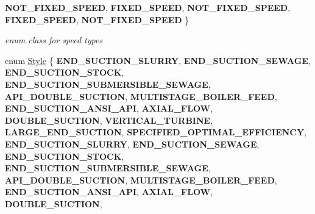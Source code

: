 \begin{DoxyCompactItemize}
{\bfseries N\+O\+T\+\_\+\+F\+I\+X\+E\+D\+\_\+\+S\+P\+E\+ED}, 
{\bfseries F\+I\+X\+E\+D\+\_\+\+S\+P\+E\+ED}, 
{\bfseries N\+O\+T\+\_\+\+F\+I\+X\+E\+D\+\_\+\+S\+P\+E\+ED}, 
\newline
{\bfseries F\+I\+X\+E\+D\+\_\+\+S\+P\+E\+ED}, 
{\bfseries N\+O\+T\+\_\+\+F\+I\+X\+E\+D\+\_\+\+S\+P\+E\+ED}
 \}\begin{DoxyCompactList}\small\item\em enum class for speed types \end{DoxyCompactList}
\item 
\mbox{\label{class_pump_aef354601ce4218258cc898b35a1e90ff}} 
enum \hyperlink{class_pump_aef354601ce4218258cc898b35a1e90ff}{Style} \{ \newline
{\bfseries E\+N\+D\+\_\+\+S\+U\+C\+T\+I\+O\+N\+\_\+\+S\+L\+U\+R\+RY}, 
{\bfseries E\+N\+D\+\_\+\+S\+U\+C\+T\+I\+O\+N\+\_\+\+S\+E\+W\+A\+GE}, 
{\bfseries E\+N\+D\+\_\+\+S\+U\+C\+T\+I\+O\+N\+\_\+\+S\+T\+O\+CK}, 
{\bfseries E\+N\+D\+\_\+\+S\+U\+C\+T\+I\+O\+N\+\_\+\+S\+U\+B\+M\+E\+R\+S\+I\+B\+L\+E\+\_\+\+S\+E\+W\+A\+GE}, 
\newline
{\bfseries A\+P\+I\+\_\+\+D\+O\+U\+B\+L\+E\+\_\+\+S\+U\+C\+T\+I\+ON}, 
{\bfseries M\+U\+L\+T\+I\+S\+T\+A\+G\+E\+\_\+\+B\+O\+I\+L\+E\+R\+\_\+\+F\+E\+ED}, 
{\bfseries E\+N\+D\+\_\+\+S\+U\+C\+T\+I\+O\+N\+\_\+\+A\+N\+S\+I\+\_\+\+A\+PI}, 
{\bfseries A\+X\+I\+A\+L\+\_\+\+F\+L\+OW}, 
\newline
{\bfseries D\+O\+U\+B\+L\+E\+\_\+\+S\+U\+C\+T\+I\+ON}, 
{\bfseries V\+E\+R\+T\+I\+C\+A\+L\+\_\+\+T\+U\+R\+B\+I\+NE}, 
{\bfseries L\+A\+R\+G\+E\+\_\+\+E\+N\+D\+\_\+\+S\+U\+C\+T\+I\+ON}, 
{\bfseries S\+P\+E\+C\+I\+F\+I\+E\+D\+\_\+\+O\+P\+T\+I\+M\+A\+L\+\_\+\+E\+F\+F\+I\+C\+I\+E\+N\+CY}, 
\newline
{\bfseries E\+N\+D\+\_\+\+S\+U\+C\+T\+I\+O\+N\+\_\+\+S\+L\+U\+R\+RY}, 
{\bfseries E\+N\+D\+\_\+\+S\+U\+C\+T\+I\+O\+N\+\_\+\+S\+E\+W\+A\+GE}, 
{\bfseries E\+N\+D\+\_\+\+S\+U\+C\+T\+I\+O\+N\+\_\+\+S\+T\+O\+CK}, 
{\bfseries E\+N\+D\+\_\+\+S\+U\+C\+T\+I\+O\+N\+\_\+\+S\+U\+B\+M\+E\+R\+S\+I\+B\+L\+E\+\_\+\+S\+E\+W\+A\+GE}, 
\newline
{\bfseries A\+P\+I\+\_\+\+D\+O\+U\+B\+L\+E\+\_\+\+S\+U\+C\+T\+I\+ON}, 
{\bfseries M\+U\+L\+T\+I\+S\+T\+A\+G\+E\+\_\+\+B\+O\+I\+L\+E\+R\+\_\+\+F\+E\+ED}, 
{\bfseries E\+N\+D\+\_\+\+S\+U\+C\+T\+I\+O\+N\+\_\+\+A\+N\+S\+I\+\_\+\+A\+PI}, 
{\bfseries A\+X\+I\+A\+L\+\_\+\+F\+L\+OW}, 
\newline
{\bfseries D\+O\+U\+B\+L\+E\+\_\+\+S\+U\+C\+T\+I\+ON}, 

\end{DoxyCompactItemize}
